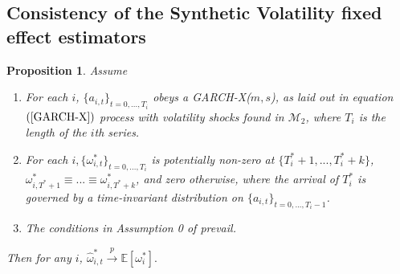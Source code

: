 \documentclass[11pt]{article}
\def\mc#1{\mathcal{#1}} %
\def\E{\mathbb{E}} %
\def\mc#1{\mathcal{#1}}
\newtheorem{prop}{Proposition}
\theoremstyle{definition}
\newenvironment{proof-of-proposition}[1][{}]{\noindent{\bf
    Proof of Proposition {#1}}
  \hspace*{.5em}}{\qed\bigskip\\}
\begin{document}

\subsection{Consistency of the Synthetic Volatility fixed effect estimators}

\begin{prop}\label{omega_consistency}
Assume
\begin{enumerate}
  \item For each $i$, $\{a_{i,t}\}_{t=0,...,T_i}$ obeys a GARCH-X($m,s$), as laid out in equation $(\ref{GARCH-X})$ process with volatility shocks found in $\mc{M}_{2}$, where $T_i$ is the length of the $i$th series.
  \item For each $i, \{\omega_{i,t}^{*}\}_{t=0,...,T_i}$ is potentially non-zero at $\{T^{*}_{i}+1,... ,T^{*}_{i}+k\}$, $\omega_{i,T^{*}+1}^{*}\equiv...\equiv\omega_{i,T^{*}+k}^{*}$, and zero otherwise, where the arrival of $T_{i}^{*}$ is governed by a time-invariant distribution on $\{a_{i,t}\}_{t=0,...,T_i-1}$. \label{stationarity_of_omega_i_t}
  \item The conditions in Assumption 0 of \citet{han2014asymptotic} prevail.
\end{enumerate}
Then for any $i$, $\hat\omega_{i,t}^{*} \xrightarrow{p} \E[\omega_{i}^{*}].$
\end{prop}
\end{document}
